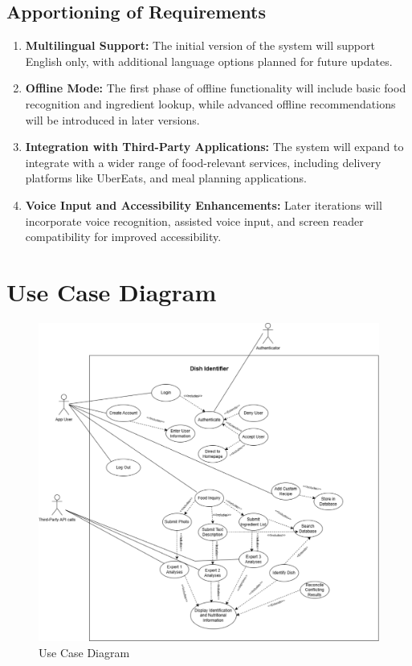 \documentclass[]{article}
\begin{document}
\subsection{Apportioning of Requirements}
\label{sub:apportioning_of_requirements}
\begin{enumerate}
    \item \textbf{Multilingual Support:} The initial version of the system will support English only, with additional language options planned for future updates.
    \item \textbf{Offline Mode:} The first phase of offline functionality will include basic food recognition and ingredient lookup, while advanced offline recommendations will be introduced in later versions.
    \item \textbf{Integration with Third-Party Applications:} The system will expand to integrate with a wider range of food-relevant services, including delivery platforms like UberEats, and meal planning applications.
    \item \textbf{Voice Input and Accessibility Enhancements:} Later iterations will incorporate voice recognition, assisted voice input, and screen reader compatibility for improved accessibility.
\end{enumerate}

\section{Use Case Diagram}
\label{sec:use_case_diagram}

\begin{figure}[H]
    \centering
    \includegraphics[width=\textwidth]{image/3_use_case_diagram.pdf}
    \caption{Use Case Diagram}
\end{figure}
\end{document}
